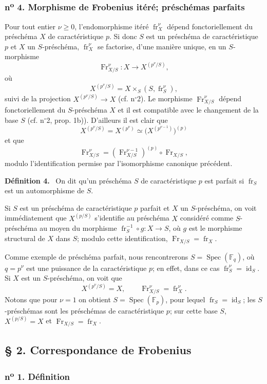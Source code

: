 \documentclass[11pt]{article}
\newenvironment{statement}[1]{\par\medskip\noindent\textbf{#1.}\ }{\par\medskip}
\DeclareMathOperator{\Spec}{Spec}
\providecommand{\id}{\operatorname{id}}
\providecommand{\id}{\operatorname{id}}
\providecommand{\id}{\operatorname{id}}
\providecommand{\id}{\operatorname{id}}
\providecommand{\Spec}{\operatorname{Spec}}
\providecommand{\Spec}{\operatorname{Spec}}
\providecommand{\id}{\operatorname{id}}
\providecommand{\Spec}{\operatorname{Spec}}
\providecommand{\fr}{\operatorname{fr}}
\providecommand{\Fr}{\operatorname{Fr}}
\providecommand{\Fr}{\operatorname{Fr}}
\providecommand{\fr}{\operatorname{fr}}
\providecommand{\Spec}{\operatorname{Spec}}
\providecommand{\id}{\operatorname{id}}
\begin{document}
\subsubsection*{n\textsuperscript{o} 4. Morphisme de Frobenius itéré; préschémas parfaits}

Pour tout entier $\nu\geq 0$, l'endomorphisme itéré $\fr_X^\nu$ dépend fonctoriellement du préschéma $X$ de caractéristique $p$. Si donc $S$ est un préschéma de caractéristique $p$ et $X$ un $S$-préschéma, $\fr_X^\nu$ se factorise, d'une manière unique, en un $S$-morphisme
\[
\Fr_{X/S}^\nu:X\longrightarrow X^{(p^\nu/S)},
\]
où
\[
X^{(p^\nu/S)}=X\times_S(S,\fr_S^\nu),
\]
suivi de la projection $X^{(p^\nu/S)}\to X$ (cf. n$^\circ$2). Le morphisme $\Fr_{X/S}^\nu$ dépend fonctoriellement du $S$-préschéma $X$ et il est compatible avec le changement de la base $S$ (cf. n$^\circ$2, prop. 1b)). D'ailleurs il est clair que
\[
X^{(p^\nu/S)}=X^{(p^\nu)}\simeq\bigl(X^{(p^{\nu-1})}\bigr)^{(p)}
\]
et que
\[
\Fr_{X/S}^\nu=(\Fr_{X/S}^{\nu-1})^{(p)}\circ\Fr_{X/S},
\]
modulo l'identification permise par l'isomorphisme canonique précédent.

\begin{statement}{Définition 4}
On dit qu'un préschéma $S$ de caractéristique $p$ est parfait si $\fr_S$ est un automorphisme de $S$.
\end{statement}

Si $S$ est un préschéma de caractéristique $p$ parfait et $X$ un $S$-préschéma, on voit immédiatement que $X^{(p/S)}$ s'identifie au préschéma $X$ considéré comme $S$-préschéma au moyen du morphisme $\fr_S^{-1}\circ g:X\to S$, où $g$ est le morphisme structural de $X$ dans $S$; modulo cette identification, $\Fr_{X/S}=\fr_X$.

Comme exemple de préschéma parfait, nous rencontrerons $S=\Spec(\mathbb F_q)$, où $q=p^\nu$ est une puissance de la caractéristique $p$; en effet, dans ce cas $\fr_S^\nu=\id_S$. Si $X$ est un $S$-préschéma, on voit que
\[
X^{(p^\nu/S)}=X,
\qquad
\Fr_{X/S}^\nu=\fr_X^\nu.
\]
Notons que pour $\nu=1$ on obtient $S=\Spec(\mathbb F_p)$, pour lequel $\fr_S=\id_S$; les $S$-préschémas sont les préschémas de caractéristique $p$; sur cette base $S$, $X^{(p/S)}=X$ et $\Fr_{X/S}=\fr_X$.

\subsection*{§ 2. Correspondance de Frobenius}

\subsubsection*{n\textsuperscript{o} 1. Définition}
\end{document}

